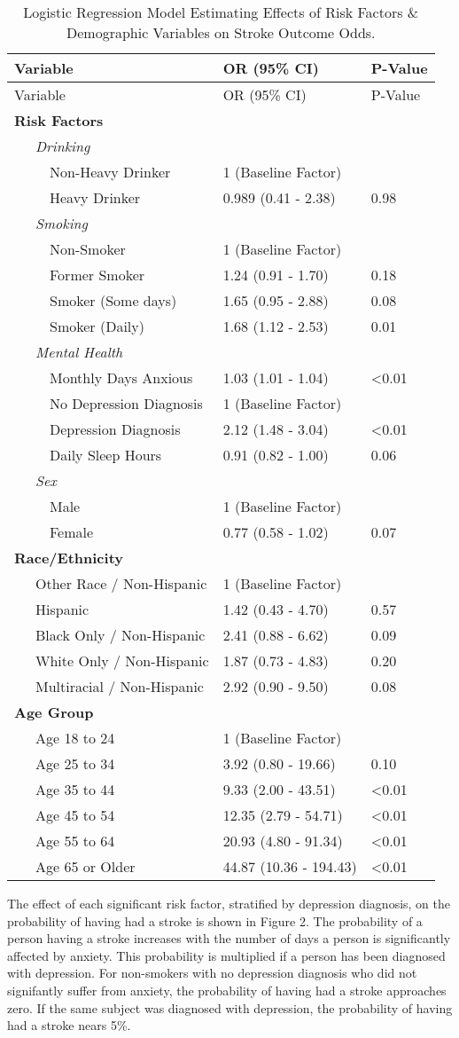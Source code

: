 \documentclass[11pt,]{article}
\begin{document}
\begin{longtable}[]{@{}lll@{}}
\caption{Logistic Regression Model Estimating Effects of Risk Factors \&
Demographic Variables on Stroke Outcome Odds.}\tabularnewline
\toprule
Variable & OR (95\% CI) & P-Value\tabularnewline
\midrule
\endfirsthead
\toprule
Variable & OR (95\% CI) & P-Value\tabularnewline
\midrule
\endhead
\textbf{Risk Factors} & &\tabularnewline
~~~\emph{Drinking} & &\tabularnewline
~~~~~Non-Heavy Drinker & 1 (Baseline Factor) &\tabularnewline
~~~~~Heavy Drinker & 0.989 (0.41 - 2.38) & 0.98\tabularnewline
~~~\emph{Smoking} & &\tabularnewline
~~~~~Non-Smoker & 1 (Baseline Factor) &\tabularnewline
~~~~~Former Smoker & 1.24 (0.91 - 1.70) & 0.18\tabularnewline
~~~~~Smoker (Some days) & 1.65 (0.95 - 2.88) & 0.08\tabularnewline
~~~~~Smoker (Daily) & 1.68 (1.12 - 2.53) & 0.01\tabularnewline
~~~\emph{Mental Health} & &\tabularnewline
~~~~~Monthly Days Anxious & 1.03 (1.01 - 1.04) &
\textless{}0.01\tabularnewline
~~~~~No Depression Diagnosis & 1 (Baseline Factor) &\tabularnewline
~~~~~Depression Diagnosis & 2.12 (1.48 - 3.04) &
\textless{}0.01\tabularnewline
~~~~~Daily Sleep Hours & 0.91 (0.82 - 1.00) & 0.06\tabularnewline
~~~\emph{Sex} & &\tabularnewline
~~~~~Male & 1 (Baseline Factor) &\tabularnewline
~~~~~Female & 0.77 (0.58 - 1.02) & 0.07\tabularnewline
\textbf{Race/Ethnicity} & &\tabularnewline
~~~Other Race / Non-Hispanic & 1 (Baseline Factor) &\tabularnewline
~~~Hispanic & 1.42 (0.43 - 4.70) & 0.57\tabularnewline
~~~Black Only / Non-Hispanic & 2.41 (0.88 - 6.62) & 0.09\tabularnewline
~~~White Only / Non-Hispanic & 1.87 (0.73 - 4.83) & 0.20\tabularnewline
~~~Multiracial / Non-Hispanic & 2.92 (0.90 - 9.50) & 0.08\tabularnewline
\textbf{Age Group} & &\tabularnewline
~~~Age 18 to 24 & 1 (Baseline Factor) &\tabularnewline
~~~Age 25 to 34 & 3.92 (0.80 - 19.66) & 0.10\tabularnewline
~~~Age 35 to 44 & 9.33 (2.00 - 43.51) & \textless{}0.01\tabularnewline
~~~Age 45 to 54 & 12.35 (2.79 - 54.71) & \textless{}0.01\tabularnewline
~~~Age 55 to 64 & 20.93 (4.80 - 91.34) & \textless{}0.01\tabularnewline
~~~Age 65 or Older & 44.87 (10.36 - 194.43) &
\textless{}0.01\tabularnewline
\bottomrule
\end{longtable}

The effect of each significant risk factor, stratified by depression
diagnosis, on the probability of having had a stroke is shown in Figure
2. The probability of a person having a stroke increases with the number
of days a person is significantly affected by anxiety. This probability
is multiplied if a person has been diagnosed with depression. For
non-smokers with no depression diagnosis who did not signifantly suffer
from anxiety, the probability of having had a stroke approaches zero. If
the same subject was diagnosed with depression, the probability of
having had a stroke nears 5\%.
\end{document}
